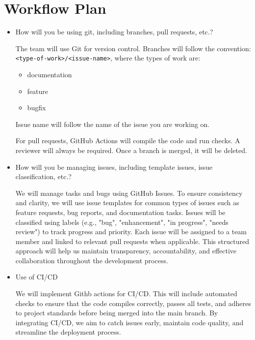 \documentclass{article}
\begin{document}
\section{Workflow Plan}

\begin{itemize}
  \item How will you be using git, including branches, pull requests, etc.?

  The team will use Git for version control. Branches will follow the convention:
  \texttt{<type-of-work>/<issue-name>}, where the types of work are:
  \begin{itemize}
      \item documentation
      \item feature
      \item bugfix
  \end{itemize}

  Issue name will follow the name of the issue you are working on.

  For pull requests, GitHub Actions will compile the code and run checks. A reviewer will always be required. Once a branch is merged, it will be deleted.

  \item How will you be managing issues, including template issues, issue classification, etc.?
  
  We will manage tasks and bugs using GitHub Issues. To ensure consistency and clarity, we will use issue templates for common types of issues such as feature requests, bug reports, and documentation tasks. Issues will be classified using labels (e.g., "bug", "enhancement", "in progress", "needs review") to track progress and priority. Each issue will be assigned to a team member and linked to relevant pull requests when applicable. This structured approach will help us maintain transparency, accountability, and effective collaboration throughout the development process.

  \item Use of CI/CD
  
  We will implement Githb actions for CI/CD. This will include automated checks to ensure that the code compiles correctly, passes all tests, and adheres to project standards before being merged into the main branch. By integrating CI/CD, we aim to catch issues early, maintain code quality, and streamline the deployment process.  



\end{itemize}
\end{document}
